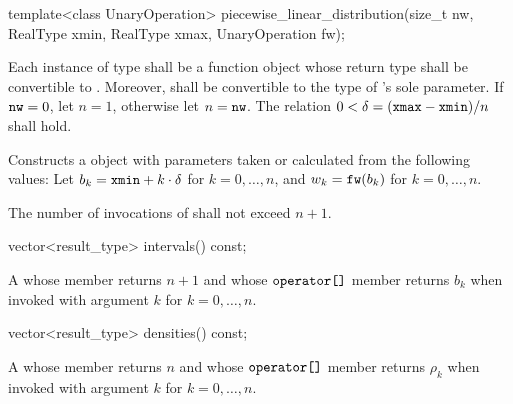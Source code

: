 %
\begin{itemdecl}
template<class UnaryOperation>
 piecewise_linear_distribution(size_t nw, RealType xmin, RealType xmax, UnaryOperation fw);
\end{itemdecl}

\begin{itemdescr}
\pnum\requires
 Each instance of type 
 shall be a function object
 whose return type shall be convertible to .
 Moreover,
  shall be convertible
 to the type of 's sole parameter.
 If $\texttt{nw} = 0$, let $n = 1$, otherwise let $n = \texttt{nw}$.
 The relation $0 < \delta = (\texttt{xmax} - \texttt{xmin}) / n$
 shall hold.

\pnum\effects Constructs a  object
 with parameters taken or calculated
 from the following values:
 Let $b_k = \texttt{xmin} + k \cdot \delta$ for $k = 0, \dotsc, n$,
 and $w_k = \texttt{fw}(b_k)$ for $k = 0, \dotsc, n$.

\pnum\complexity
 The number of invocations of  shall not exceed $n+1$.
\end{itemdescr}

%
\begin{itemdecl}
vector<result_type> intervals() const;
\end{itemdecl}

\begin{itemdescr}
\pnum\returns A 
 whose  member returns $n + 1$
 and whose $ \texttt{operator[]} $ member returns $b_k$
 when invoked with argument $k$ for $k = 0, \dotsc, n$.
\end{itemdescr}

%
\begin{itemdecl}
vector<result_type> densities() const;
\end{itemdecl}

\begin{itemdescr}
\pnum\returns A 
 whose  member returns $n$
 and whose $ \texttt{operator[]} $ member returns $\rho_k$
 when invoked with argument $k$ for $k = 0, \dotsc, n$.
\end{itemdescr}%
%
%
%
%


